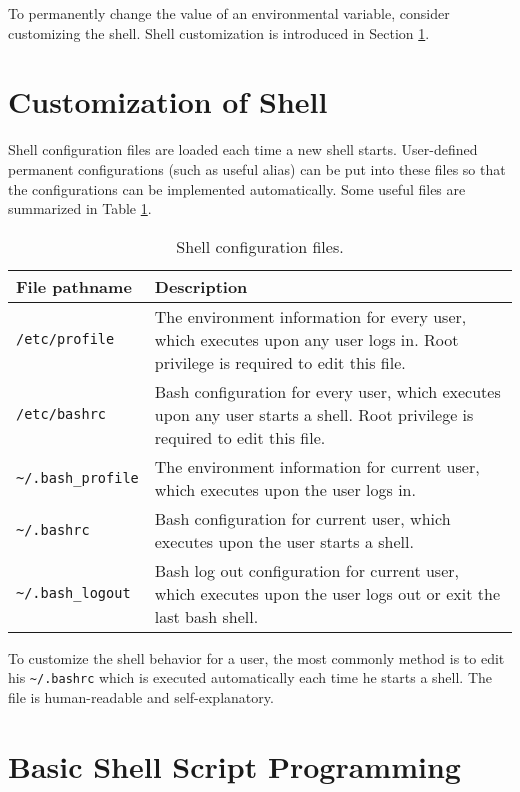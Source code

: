 To permanently change the value of an environmental variable, consider customizing the shell. Shell customization is introduced in Section \ref{ch:sb:subsec:customizeshell}.

\section{Customization of Shell} \label{ch:sb:subsec:customizeshell}

Shell configuration files are loaded each time a new shell starts. User-defined permanent configurations (such as useful alias) can be put into these files so that the configurations can be implemented automatically. Some useful files are summarized in Table \ref{ch:sb:tab:shellconfig}.

\begin{table}
	\centering \caption{Shell configuration files.}\label{ch:sb:tab:shellconfig}
	\begin{tabularx}{\textwidth}{lX}
		\hline
		File pathname & Description \\ \hline
		\verb|/etc/profile| & The environment information for every user, which executes upon any user logs in. Root privilege is required to edit this file.  \\ 
		\verb|/etc/bashrc| & Bash configuration for every user, which executes upon any user starts a shell. Root privilege is required to edit this file. \\ 
		\verb|~/.bash_profile| & The environment information for current user, which executes upon the user logs in. \\ 
		\verb|~/.bashrc| & Bash configuration for current user, which executes upon the user starts a shell. \\ 
		\verb|~/.bash_logout| & Bash log out configuration for current user, which executes upon the user logs out or exit the last bash shell. \\ \hline
	\end{tabularx}
\end{table}

To customize the shell behavior for a user, the most commonly method is to edit his \verb|~/.bashrc| which is executed automatically each time he starts a shell. The file is human-readable and self-explanatory.

\section{Basic Shell Script Programming}

